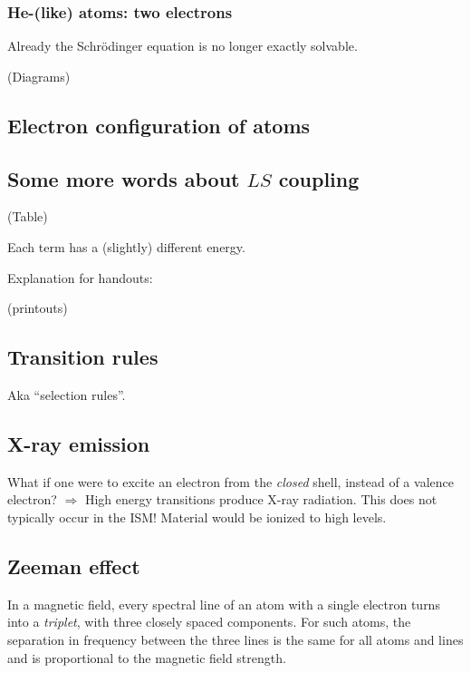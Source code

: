 \documentclass[11pt]{article}
\newcommand{\mar}[1]{\hspace{0pt}\marginpar{-\textcolor{black}{#1}-}}
\begin{document}
\subsubsection{He-(like) atoms: two electrons}
Already the Schr\"{o}dinger equation is no longer exactly solvable.

\mar{I 11}(Diagrams)

\mar{I 12}

\mar{I 13}

\subsection{Electron configuration of atoms}

\mar{I 14}

\subsection{Some more words about $LS$ coupling}

\mar{I 15}(Table)

\mar{I 16}Each term has a (slightly) different energy.

\mar{I 17}Explanation for handouts:

\mar{I 18}(printouts)

\subsection{Transition rules}
\mar{I 19}Aka ``selection rules''.

\subsection{X-ray emission}
\mar{I 20}What if one were to excite an electron from the \emph{closed} shell,
instead of a valence electron? $\Rightarrow$ High energy transitions
produce X-ray radiation. This does not typically occur in the ISM!
Material would be ionized to high levels.

\subsection{Zeeman effect}
In a magnetic field, every spectral line of an atom with a single electron
turns into a \textit{triplet}, with three closely spaced components.
For such atoms, the separation in frequency between the three lines
is the same for all atoms and lines and is proportional to the magnetic
field strength.
\end{document}
